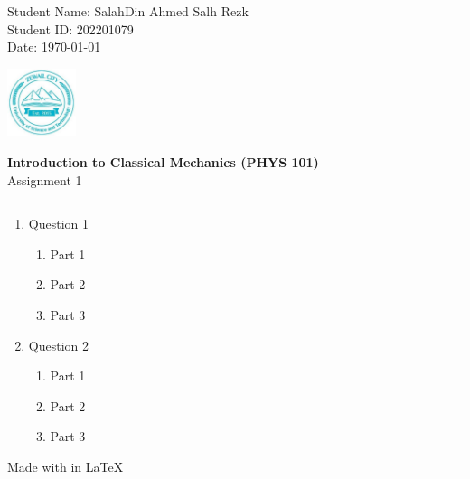 \documentclass[11pt,letterpaper]{article}
\begin{document}
\pagestyle{plain}

\begin{flushleft}
Student Name: SalahDin Ahmed Salh Rezk\\
Student ID: 202201079 \\
Date: \today
\end{flushleft}

\begin{flushright}\vspace{-15mm}
\includegraphics[height=2cm]{zcust.jpg}
\end{flushright}

\begin{center}\vspace{-1cm}
\textbf{\large Introduction to Classical Mechanics (PHYS 101)}\\
Assignment 1
\end{center}


\rule{\linewidth}{0.1mm}

\bigskip
\bigskip

\begin{enumerate}

\item Question 1

\begin{enumerate}
    \item Part 1
    \item Part 2
    \item Part 3
\end{enumerate}

\item Question 2

\begin{enumerate}
    \item Part 1
    \item Part 2
    \item Part 3
\end{enumerate}

\end{enumerate}

\vfill
\begin{center}
    Made with  in {\LaTeX}
\end{center}
\end{document}
